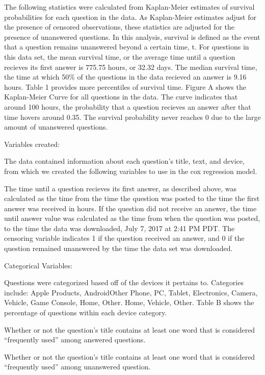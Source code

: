 \documentclass[12pt]{article}
\begin{document}
    The following statistics were calculated from Kaplan-Meier estimates of survival probabilities for each question in the data. As Kaplan-Meier estimates adjust for the presence of censored observations, these statistics are adjusted for the presence of unanswered questions. In this analysis, survival is defined as the event that a question remains unanswered beyond a certain time, t. For questions in this data set, the mean survival time, or the average time until a question recieves its first answer is 775.75 hours, or 32.32 days. The median survival time, the time at which 50\% of the questions in the data recieved an answer is 9.16 hours. Table 1 provides more percentiles of survival time. 
    Figure A shows the Kaplan-Meier Curve for all questions in the data. The curve indicates that around 100 hours, the probability that a question recieves an answer after that time hovers around 0.35. The survival probability never reaches 0 due to the large amount of unanswered questions. 
    
    Variables created: 
    
    The data contained information about each question's title, text, and device, from which we created the following variables to use in the cox regression model. 

The time until a question recieves its first answer, as described above, was calculated as the time from the time the question was posted to the time the first answer was received in hours. If the question did not receive an answer, the time until answer value was calculated as the time from when the question was posted, to the time the data was downloaded, July 7, 2017 at 2:41 PM PDT. The censoring variable indicates 1 if the question received an answer, and 0 if the question remained unanswered by the time the data set was downloaded.

Categorical Variables: 

Questions were categorized based off of the devices it pertains to. Categories include: Apple Products, Android\/Other Phone, PC, Tablet, Electronics, Camera, Vehicle, Game Console, Home, Other. Home, Vehicle, Other. Table B shows the percentage of questions within each device category. 

Whether or not the question's title contains at least one word that is considered ``frequently used'' among answered questions.

Whether or not the question's title contains at least one word that is considered ``frequently used'' among unanswered question. 
\end{document}

